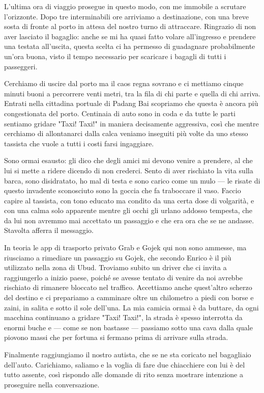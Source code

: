 L'ultima ora di viaggio prosegue in questo modo, con me immobile a scrutare l'orizzonte. Dopo tre interminabili ore arriviamo a destinazione, con una breve sosta di fronte al porto in attesa del nostro turno di attraccare. Ringrazio di non aver lasciato il bagaglio: anche se mi ha quasi fatto volare all'ingresso e prendere una testata all'uscita, questa scelta ci ha permesso di guadagnare probabilmente un'ora buona, visto il tempo necessario per scaricare i bagagli di tutti i passeggeri.

Cerchiamo di uscire dal porto ma il caos regna sovrano e ci mettiamo cinque minuti buoni a percorrere venti metri, tra la fila di chi parte e quella di chi arriva. Entrati nella cittadina portuale di Padang Bai scopriamo che questa è ancora più congestionata del porto. Centinaia di auto sono in coda e da tutte le parti sentiamo gridare "Taxi! Taxi!" in maniera decisamente aggressiva, così che mentre cerchiamo di allontanarci dalla calca veniamo inseguiti più volte da uno stesso tassista che vuole a tutti i costi farsi ingaggiare.

Sono ormai esausto: gli dico che degli amici mi devono venire a prendere, al che lui si mette a ridere dicendo di non crederci. Sento di aver rischiato la vita sulla barca, sono disidratato, ho mal di testa e sono carico come un mulo — le risate di questo invadente sconosciuto sono la goccia che fa traboccare il vaso. Faccio capire al tassista, con tono educato ma condito da una certa dose di volgarità, e con una calma solo apparente mentre gli occhi gli urlano addosso tempesta, che da lui non avremmo mai accettato un passaggio e che era ora che se ne andasse. Stavolta afferra il messaggio.

In teoria le app di trasporto privato Grab e Gojek qui non sono ammesse, ma riusciamo a rimediare un passaggio su Gojek, che secondo Enrico è il più utilizzato nella zona di Ubud. Troviamo subito un driver che ci invita a raggiungerlo a inizio paese, poiché se avesse tentato di venire da noi avrebbe rischiato di rimanere bloccato nel traffico. Accettiamo anche quest'altro scherzo del destino e ci prepariamo a camminare oltre un chilometro a piedi con borse e zaini, in salita e sotto il sole dell'una. La mia camicia ormai è da buttare, da ogni macchina continuano a gridare "Taxi! Taxi!", la strada è spesso interrotta da enormi buche e — come se non bastasse — passiamo sotto una cava dalla quale piovono massi che per fortuna si fermano prima di arrivare sulla strada.

Finalmente raggiungiamo il nostro autista, che se ne sta coricato nel bagagliaio dell'auto. Carichiamo, saliamo e la voglia di fare due chiacchiere con lui è del tutto assente, così rispondo alle domande di rito senza mostrare intenzione a proseguire nella conversazione.

